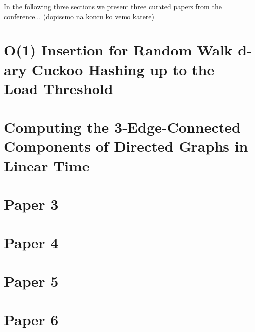 \documentclass[
	a4paper, %
	10pt, %
	unnumberedsections, %
	twoside, %
]{LTJournalArticle}
\theoremstyle{remark}
\begin{document}
In the following three sections we present three curated papers from the conference... (dopisemo na koncu ko vemo katere)


\section{O(1) Insertion for Random Walk d-ary Cuckoo Hashing
up to the Load Threshold}



\section{Computing the 3-Edge-Connected Components of Directed Graphs in Linear Time}




\section{Paper 3}



\section{Paper 4}



\section{Paper 5}



\section{Paper 6}




\printbibliography %

\end{document}
